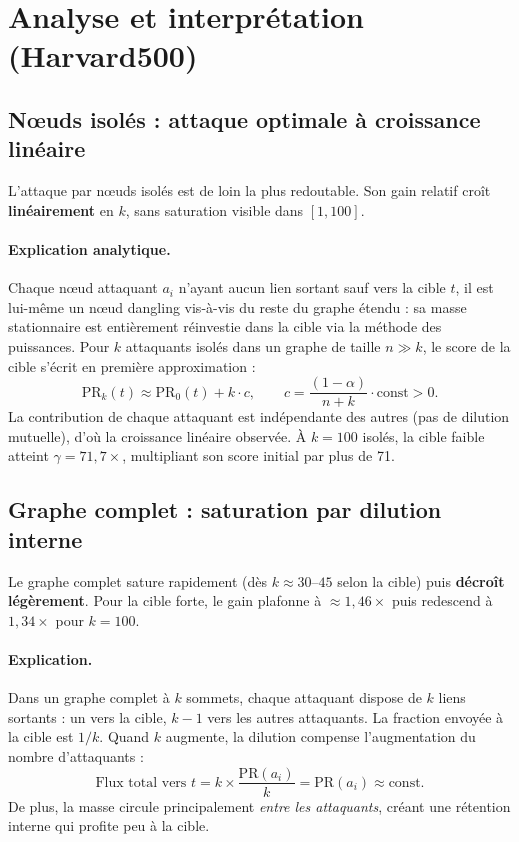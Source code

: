 \documentclass[12pt,a4paper]{article}
\newcommand{\PR}{\mathrm{PR}}
\theoremstyle{definition}
\begin{document}
\section{Analyse et interpr\'{e}tation (Harvard500)}

\subsection{N\oe{}uds isol\'{e}s : attaque optimale \`{a} croissance lin\'{e}aire}

L'attaque par n\oe{}uds isol\'{e}s est de loin la plus redoutable.
Son gain relatif cro\^{i}t \textbf{lin\'{e}airement} en $k$, sans saturation
visible dans $[1, 100]$.

\paragraph{Explication analytique.}
Chaque n\oe{}ud attaquant $a_i$ n'ayant aucun lien sortant sauf vers la cible
$t$, il est lui-m\^{e}me un n\oe{}ud dangling vis-\`{a}-vis du reste du graphe
\'{e}tendu : sa masse stationnaire est enti\`{e}rement r\'{e}investie dans la cible
via la m\'{e}thode des puissances. Pour $k$ attaquants isol\'{e}s dans un graphe
de taille $n \gg k$, le score de la cible s'\'{e}crit en premi\`{e}re approximation :
\[
  \PR_k(t) \approx \PR_0(t) + k \cdot c, \qquad c = \frac{(1-\alpha)}{n+k} \cdot \text{const} > 0.
\]
La contribution de chaque attaquant est ind\'{e}pendante des autres (pas de
dilution mutuelle), d'o\`{u} la croissance lin\'{e}aire observ\'{e}e. \`{A} $k=100$
isol\'{e}s, la cible faible atteint $\gamma = 71{,}7\times$, multipliant son
score initial par plus de 71.

\subsection{Graphe complet : saturation par dilution interne}

Le graphe complet sature rapidement (d\`{e}s $k \approx 30$--$45$ selon la cible)
puis \textbf{d\'{e}cro\^{i}t l\'{e}g\`{e}rement}. Pour la cible forte, le gain plafonne
\`{a} $\approx 1{,}46\times$ puis redescend \`{a} $1{,}34\times$ pour $k=100$.

\paragraph{Explication.}
Dans un graphe complet \`{a} $k$ sommets, chaque attaquant dispose de $k$ liens
sortants : un vers la cible, $k-1$ vers les autres attaquants. La fraction
envoy\'{e}e \`{a} la cible est $1/k$. Quand $k$ augmente, la dilution compense
l'augmentation du nombre d'attaquants :
\[
  \text{Flux total vers } t = k \times \frac{\PR(a_i)}{k} = \PR(a_i) \approx \text{const.}
\]
De plus, la masse circule principalement \emph{entre les attaquants},
cr\'{e}ant une r\'{e}tention interne qui profite peu \`{a} la cible.
\end{document}
